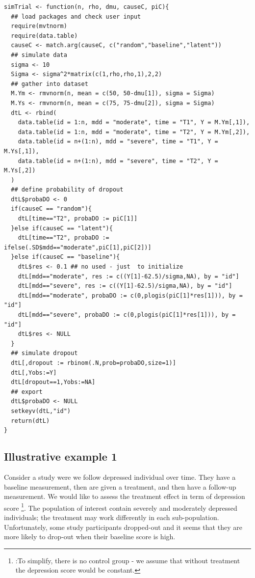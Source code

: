 \documentclass[12pt]{article}
\begin{document}
\clearpage

\lstset{language=r,label= ,caption= ,captionpos=b,numbers=none}
\begin{lstlisting}
simTrial <- function(n, rho, dmu, causeC, piC){
  ## load packages and check user input
  require(mvtnorm)
  require(data.table)
  causeC <- match.arg(causeC, c("random","baseline","latent"))
  ## simulate data
  sigma <- 10
  Sigma <- sigma^2*matrix(c(1,rho,rho,1),2,2)
  ## gather into dataset
  M.Ym <- rmvnorm(n, mean = c(50, 50-dmu[1]), sigma = Sigma)
  M.Ys <- rmvnorm(n, mean = c(75, 75-dmu[2]), sigma = Sigma)
  dtL <- rbind(
    data.table(id = 1:n, mdd = "moderate", time = "T1", Y = M.Ym[,1]),
    data.table(id = 1:n, mdd = "moderate", time = "T2", Y = M.Ym[,2]),
    data.table(id = n+(1:n), mdd = "severe", time = "T1", Y = M.Ys[,1]),
    data.table(id = n+(1:n), mdd = "severe", time = "T2", Y = M.Ys[,2])
  )
  ## define probability of dropout
  dtL$probaDO <- 0
  if(causeC == "random"){
    dtL[time=="T2", probaDO := piC[1]]
  }else if(causeC == "latent"){
    dtL[time=="T2", probaDO := ifelse(.SD$mdd=="moderate",piC[1],piC[2])]
  }else if(causeC == "baseline"){
    dtL$res <- 0.1 ## no used - just  to initialize
    dtL[mdd=="moderate", res := c((Y[1]-62.5)/sigma,NA), by = "id"]
    dtL[mdd=="severe", res := c((Y[1]-62.5)/sigma,NA), by = "id"]
    dtL[mdd=="moderate", probaDO := c(0,plogis(piC[1]*res[1])), by = "id"]
    dtL[mdd=="severe", probaDO := c(0,plogis(piC[1]*res[1])), by = "id"]
    dtL$res <- NULL
  }
  ## simulate dropout
  dtL[,dropout := rbinom(.N,prob=probaDO,size=1)]
  dtL[,Yobs:=Y]
  dtL[dropout==1,Yobs:=NA]
  ## export
  dtL$probaDO <- NULL
  setkeyv(dtL,"id")
  return(dtL)
}
\end{lstlisting}

\clearpage

\subsection{Illustrative example 1}
\label{sec:org332a673}

Consider a study were we follow depressed individual over time. They
have a baseline measurement, then are given a treatment, and then have
a follow-up measurement. We would like to assess the treatment effect
in term of depression score \footnote{:To simplify, there is no control
group - we assume that without treatment the depression score would be
constant.}. The population of interest contain severely and moderately
depressed individuals; the treatment may work differently in each
sub-population. Unfortunately, some study participants dropped-out and
it seems that they are more likely to drop-out when their baseline
score is high.
\end{document}
